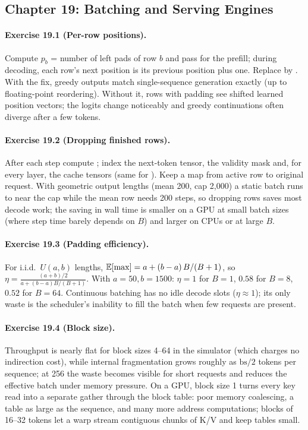 \subsection*{Chapter 19: Batching and Serving Engines}

\paragraph{Exercise 19.1 (Per-row positions).}
Compute $p_b$ = number of left pads of row $b$ and pass  for
the prefill; during decoding, each row's next position is its previous position plus one. Replace
 by . With the fix, greedy
outputs match single-sequence generation exactly (up to floating-point reordering). Without it, rows with
padding see shifted learned position vectors; the logits change noticeably and greedy continuations often
diverge after a few tokens.

\paragraph{Exercise 19.2 (Dropping finished rows).}
After each step compute ; index the next-token tensor, the validity mask and, for
every layer, the cache tensors  (same for ). Keep a map from active row to
original request. With geometric output lengths (mean 200, cap 2,000) a static batch runs to near the cap
while the mean row needs 200 steps, so dropping rows saves most decode work; the saving in wall time is
smaller on a GPU at small batch sizes (where step time barely depends on $B$) and larger on CPUs or at large $B$.

\paragraph{Exercise 19.3 (Padding efficiency).}
For i.i.d.\ $U(a,b)$ lengths, $\mathbb{E}[\max]=a+(b-a)\,B/(B+1)$, so
$\eta=\frac{(a+b)/2}{a+(b-a)B/(B+1)}$. With $a=50,b=1500$: $\eta=1$ for $B=1$, $0.58$ for $B=8$, $0.52$ for $B=64$.
Continuous batching has no idle decode slots ($\eta\approx1$); its only waste is the scheduler's inability to
fill the batch when few requests are present.

\paragraph{Exercise 19.4 (Block size).}
Throughput is nearly flat for block sizes 4--64 in the simulator (which charges no indirection cost),
while internal fragmentation grows roughly as $\text{bs}/2$ tokens per sequence; at 256 the waste becomes
visible for short requests and reduces the effective batch under memory pressure. On a GPU, block size 1
turns every key read into a separate gather through the block table: poor memory coalescing, a table as
large as the sequence, and many more address computations; blocks of 16--32 tokens let a warp stream
contiguous chunks of K/V and keep tables small.

